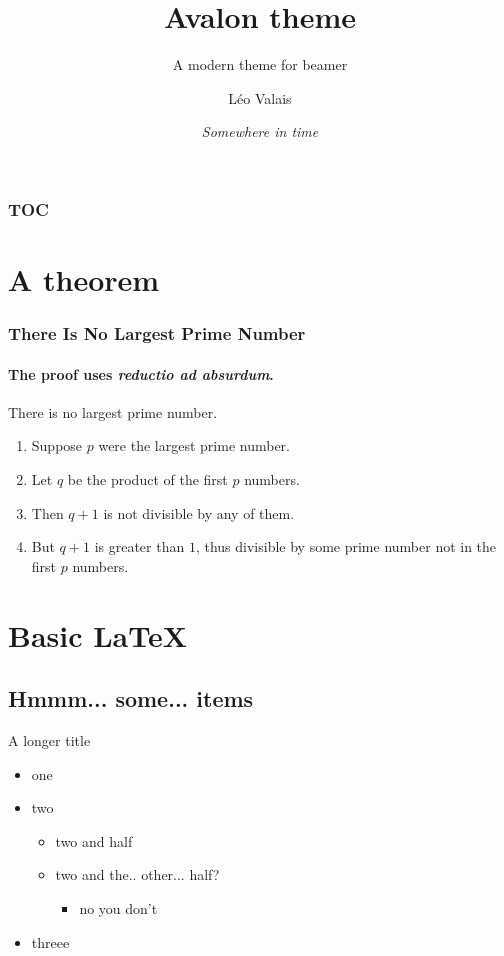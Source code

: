 \documentclass{beamer}
\title{Avalon theme}
\subtitle{A modern theme for beamer}
\date{\it{}Somewhere in time \faMusic}
\author{Léo Valais}
\institute{Institute}
\begin{document}
\begin{frame}
\titlepage
\end{frame}

\begin{frame}
  \frametitle{TOC}
  \tableofcontents{}
\end{frame}

\section{A theorem}
\begin{frame}
\frametitle{There Is No Largest Prime Number}
\framesubtitle{The proof uses \textit{reductio ad absurdum}.}
\begin{theorem}
There is no largest prime number. \end{theorem}
\begin{enumerate}
\item<1-| alert@1> Suppose $p$ were the largest prime number.
\item<2-> Let $q$ be the product of the first $p$ numbers.
\item<3-> Then $q+1$ is not divisible by any of them.
\item<1-> But $q + 1$ is greater than $1$, thus divisible by some prime
number not in the first $p$ numbers.
\end{enumerate}
\end{frame}

\section{Basic \LaTeX}
\subsection{Hmmm... some... items}
\begin{frame}{A longer title}
  \begin{itemize}
  \item one
  \item two
    \begin{itemize}
    \item two and half
    \item two and the.. other... half?
      \begin{itemize}
      \item no you don't
      \end{itemize}
    \end{itemize}
  \item \textrm{threee}
  \end{itemize}
\end{frame}
\end{document}
